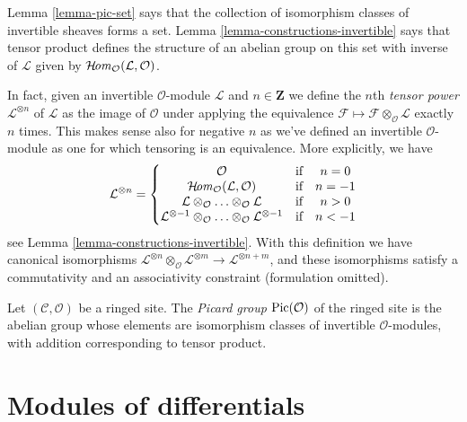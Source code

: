 \noindent
Lemma \ref{lemma-pic-set} says that the collection of
isomorphism classes of invertible sheaves forms a set.
Lemma \ref{lemma-constructions-invertible} says that
tensor product defines the structure of an abelian group
on this set with inverse of $\mathcal{L}$ given by
$\mathop{\mathcal{H}\!\mathit{om}}\nolimits_\mathcal{O}(\mathcal{L}, \mathcal{O})$.

\medskip\noindent
In fact, given an invertible $\mathcal{O}$-module
$\mathcal{L}$ and $n \in \mathbf{Z}$ we define the
$n$th {\it tensor power} $\mathcal{L}^{\otimes n}$ of $\mathcal{L}$
as the image of $\mathcal{O}$ under applying the equivalence
$\mathcal{F} \mapsto \mathcal{F} \otimes_\mathcal{O} \mathcal{L}$
exactly $n$ times. This makes sense also for negative $n$ as
we've defined an invertible
$\mathcal{O}$-module as one for which tensoring is an equivalence.
More explicitly, we have
$$
\mathcal{L}^{\otimes n} =
\left\{
\begin{matrix}
\mathcal{O} & \text{if} & n = 0 \\
\mathop{\mathcal{H}\!\mathit{om}}\nolimits_\mathcal{O}(\mathcal{L}, \mathcal{O}) & \text{if} & n = -1\\
\mathcal{L} \otimes_\mathcal{O} \ldots \otimes_\mathcal{O} \mathcal{L}
& \text{if} & n > 0 \\
\mathcal{L}^{\otimes -1} \otimes_\mathcal{O} \ldots
\otimes_\mathcal{O} \mathcal{L}^{\otimes -1}
& \text{if} & n < -1
\end{matrix}
\right.
$$
see Lemma \ref{lemma-constructions-invertible}.
With this definition we have canonical isomorphisms
$\mathcal{L}^{\otimes n} \otimes_\mathcal{O}
\mathcal{L}^{\otimes m} \to
\mathcal{L}^{\otimes n + m}$, and these isomorphisms
satisfy a commutativity and an associativity constraint
(formulation omitted).

\begin{definition}
\label{definition-pic}
Let $(\mathcal{C}, \mathcal{O})$ be a ringed site.
The {\it Picard group} $\mathop{\mathrm{Pic}}\nolimits(\mathcal{O})$ of
the ringed site is the
abelian group whose elements are isomorphism classes of
invertible $\mathcal{O}$-modules, with addition
corresponding to tensor product.
\end{definition}









\section{Modules of differentials}
\label{section-differentials}

